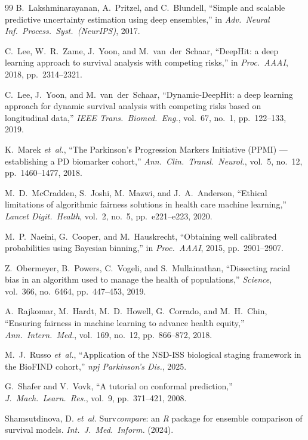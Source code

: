 \documentclass[11pt]{article}
\begin{document}
\begin{thebibliography}{99}
B.~Lakshminarayanan, A.~Pritzel, and C.~Blundell, ``Simple and scalable predictive uncertainty estimation using deep ensembles,'' in \textit{Adv.\ Neural Inf.\ Process.\ Syst.\ (NeurIPS)}, 2017.

C.~Lee, W.~R.~Zame, J.~Yoon, and M.~van~der~Schaar, ``DeepHit: a deep learning approach to survival analysis with competing risks,'' in \textit{Proc.\ AAAI}, 2018, pp.~2314--2321.

C.~Lee, J.~Yoon, and M.~van~der~Schaar, ``Dynamic-DeepHit: a deep learning approach for dynamic survival analysis with competing risks based on longitudinal data,'' \textit{IEEE Trans.\ Biomed.\ Eng.}, vol.~67, no.~1, pp.~122--133, 2019.

K.~Marek \textit{et~al.}, ``The Parkinson's Progression Markers Initiative (PPMI) --- establishing a PD biomarker cohort,'' \textit{Ann.\ Clin.\ Transl.\ Neurol.}, vol.~5, no.~12, pp.~1460--1477, 2018.

M.~D.~McCradden, S.~Joshi, M.~Mazwi, and J.~A.~Anderson, ``Ethical limitations of algorithmic fairness solutions in health care machine learning,'' \textit{Lancet Digit.\ Health}, vol.~2, no.~5, pp.~e221--e223, 2020.

M.~P.~Naeini, G.~Cooper, and M.~Hauskrecht, ``Obtaining well calibrated probabilities using Bayesian binning,'' in \textit{Proc.\ AAAI}, 2015, pp.~2901--2907.

Z.~Obermeyer, B.~Powers, C.~Vogeli, and S.~Mullainathan, ``Dissecting racial bias in an algorithm used to manage the health of populations,'' \textit{Science}, vol.~366, no.~6464, pp.~447--453, 2019.

A.~Rajkomar, M.~Hardt, M.~D.~Howell, G.~Corrado, and M.~H.~Chin, ``Ensuring fairness in machine learning to advance health equity,'' \textit{Ann.\ Intern.\ Med.}, vol.~169, no.~12, pp.~866--872, 2018.

M.~J.~Russo \textit{et~al.}, ``Application of the NSD-ISS biological staging framework in the BioFIND cohort,'' \textit{npj Parkinson's Dis.}, 2025.

G.~Shafer and V.~Vovk, ``A tutorial on conformal prediction,'' \textit{J.\ Mach.\ Learn.\ Res.}, vol.~9, pp.~371--421, 2008.

Shamsutdinova, D. \textit{et~al.} Surv\textit{compare}: an \textit{R} package for ensemble comparison of survival models. \textit{Int.\ J.\ Med.\ Inform.} (2024).


\end{thebibliography}
\end{document}
